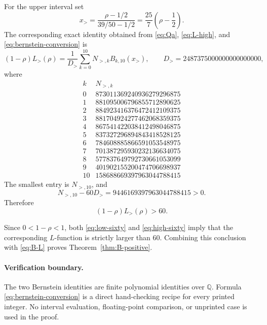 \documentclass[11pt]{article}
\begin{document}
For the upper interval set
\[
 x_>=\frac{\rho-1/2}{39/50-1/2}
 =\frac{25}{7}\left(\rho-\frac12\right).
\]
The corresponding exact identity obtained from \eqref{eq:Qa},
\eqref{eq:L-high}, and \eqref{eq:bernstein-conversion} is
\begin{equation}
 (1-\rho)L_>(\rho)
 =\frac1{D_>}\sum_{k=0}^{10}N_{>,k}B_{k,10}(x_>),
 \qquad
 D_>=2487375000000000000000,
 \label{eq:high-bernstein}
\end{equation}
where
\[
\begin{array}{c|r}
k&N_{>,k}\\ \hline
0&873011369240936279296875\\
1&881095006796855712890625\\
2&884923416376472412109375\\
3&881704924277462068359375\\
4&867541422038412498046875\\
5&837327296894843418528125\\
6&784608885866591053548975\\
7&701387295930232136634075\\
8&577837649792730661053099\\
9&401902155200474706698937\\
10&158688669397963044788415
\end{array}
\]
The smallest entry is \(N_{>,10}\), and
\[
 N_{>,10}-60D_>
 =9446169397963044788415>0.
\]
Therefore
\begin{equation}
       (1-\rho)L_>(\rho)>60.
       \label{eq:high-sixty}
\end{equation}

Since \(0<1-\rho<1\), both \eqref{eq:low-sixty} and
\eqref{eq:high-sixty} imply that the corresponding \(L\)-function is
strictly larger than \(60\).  Combining this conclusion with
\eqref{eq:B-L} proves Theorem~\ref{thm:B-positive}.

\paragraph{Verification boundary.}
The two Bernstein identities are finite polynomial identities over
\(\mathbb Q\).  Formula \eqref{eq:bernstein-conversion} is a direct
hand-checking recipe for every printed integer.  No interval evaluation,
floating-point comparison, or unprinted case is used in the proof.
\end{document}
